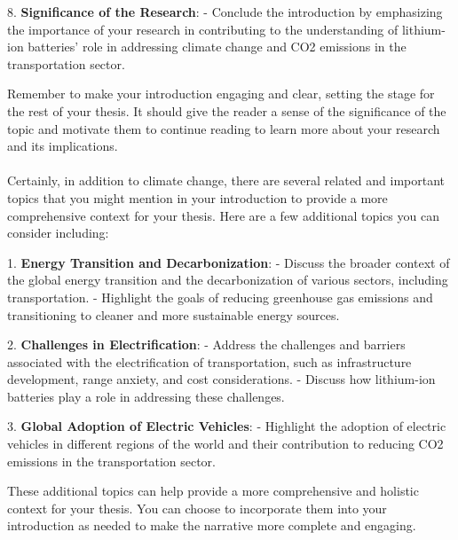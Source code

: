 8. \textbf{Significance of the Research}:
   - Conclude the introduction by emphasizing the importance of your research in contributing to the understanding of lithium-ion batteries' role in addressing climate change and CO2 emissions in the transportation sector.

Remember to make your introduction engaging and clear, setting the stage for the rest of your thesis. It should give the reader a sense of the significance of the topic and motivate them to continue reading to learn more about your research and its implications.\\
\\

Certainly, in addition to climate change, there are several related and important topics that you might mention in your introduction to provide a more comprehensive context for your thesis. Here are a few additional topics you can consider including:

1. \textbf{Energy Transition and Decarbonization}:
   - Discuss the broader context of the global energy transition and the decarbonization of various sectors, including transportation.
   - Highlight the goals of reducing greenhouse gas emissions and transitioning to cleaner and more sustainable energy sources.

2. \textbf{Challenges in Electrification}:
   - Address the challenges and barriers associated with the electrification of transportation, such as infrastructure development, range anxiety, and cost considerations.
   - Discuss how lithium-ion batteries play a role in addressing these challenges.

3. \textbf{Global Adoption of Electric Vehicles}:
   - Highlight the adoption of electric vehicles in different regions of the world and their contribution to reducing CO2 emissions in the transportation sector.

These additional topics can help provide a more comprehensive and holistic context for your thesis. You can choose to incorporate them into your introduction as needed to make the narrative more complete and engaging.
